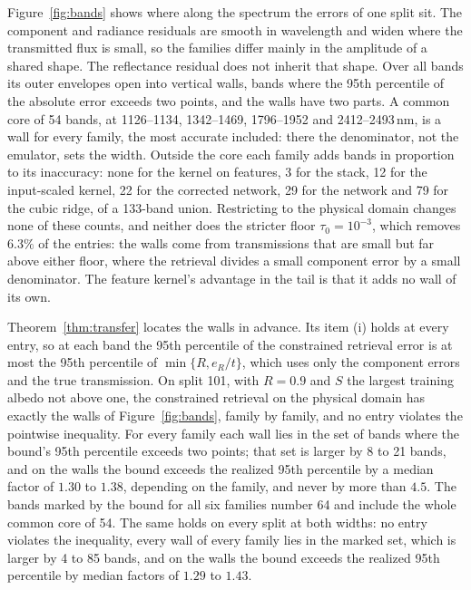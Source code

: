 Figure~\ref{fig:bands} shows where along the spectrum the errors of one split sit. The component
and radiance residuals are smooth in wavelength and widen where the transmitted flux is small, so
the families differ mainly in the amplitude of a shared shape. The reflectance residual does not
inherit that shape. Over all bands its outer envelopes open into vertical walls, bands where the
95th percentile of the absolute error exceeds two points, and the walls have two parts. A common
core of 54 bands, at 1126--1134, 1342--1469, 1796--1952 and 2412--2493\,nm, is a wall for every
family, the most accurate included: there the denominator, not the emulator, sets the width.
Outside the core each family adds bands in proportion to its inaccuracy: none for the kernel on
features, 3 for the stack, 12 for the input-scaled kernel, 22 for the corrected network, 29 for
the network and 79 for the cubic ridge, of a 133-band union. Restricting to the physical domain
changes none of these counts, and neither does the stricter floor $\tau_0=10^{-3}$, which removes
$6.3\%$ of the entries: the walls come from transmissions that are small but far above either
floor, where the retrieval divides a small component error by a small denominator. The feature
kernel's advantage in the tail is that it adds no wall of its own.

Theorem~\ref{thm:transfer} locates the walls in advance. Its item (i) holds at every entry, so at
each band the 95th percentile of the constrained retrieval error is at most the 95th percentile of
$\min\{R,e_R/t\}$, which uses only the component errors and the true transmission. On split 101,
with $R=0.9$ and $S$ the largest training albedo not above one, the constrained retrieval on the
physical domain has exactly the walls of Figure~\ref{fig:bands}, family by family, and no entry
violates the pointwise inequality. For every family each wall lies in the set of bands where the
bound's 95th percentile exceeds two points; that set is larger by 8 to 21 bands, and on the walls
the bound exceeds the realized 95th percentile by a median factor of $1.30$ to $1.38$, depending on
the family, and never by more than $4.5$. The bands marked by the bound for all six families
number 64 and include the whole common core of 54. The same holds on every split at both widths: no entry violates the inequality, every wall of every family lies in the marked set, which is larger by 4 to 85 bands, and on the walls the bound exceeds the realized 95th percentile by median factors of $1.29$ to $1.43$.

